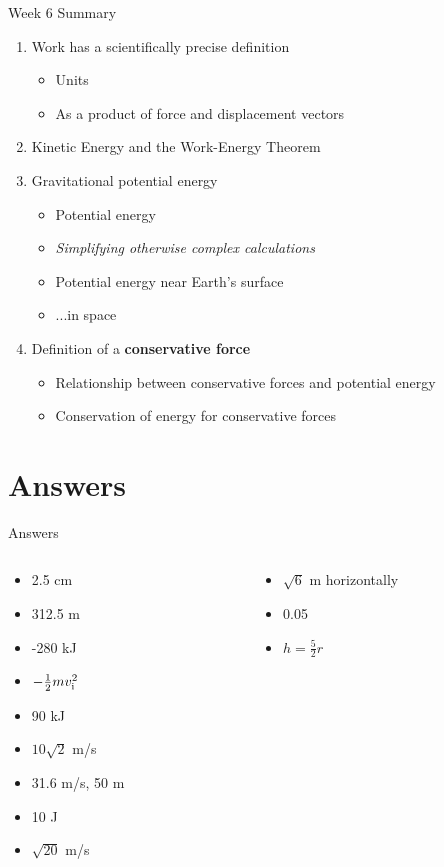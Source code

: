 \documentclass{beamer}
\begin{document}
\begin{frame}{Week 6 Summary}
\begin{enumerate}
\item \alert{Work} has a scientifically precise definition
\begin{itemize}
\item Units
\item As a product of force and displacement vectors
\end{itemize}
\item Kinetic Energy and the \alert{Work-Energy Theorem}
\item Gravitational potential energy
\begin{itemize}
\item Potential energy
\item \textit{Simplifying otherwise complex calculations}
\item Potential energy near Earth's surface
\item ...in space
\end{itemize}
\item Definition of a \textbf{conservative force}
\begin{itemize}
\item Relationship between conservative forces and potential energy
\item Conservation of energy for conservative forces
\end{itemize}
\end{enumerate}
\end{frame}

\section{Answers}

\begin{frame}{Answers}
\begin{columns}[T]
\begin{column}{0.5\textwidth}
\begin{itemize}
\item 2.5 cm
\item 312.5 m
\item -280 kJ
\item $-\frac{1}{2} m v_{\rm i}^2$
\item 90 kJ
\item $10\sqrt{2}$ m/s
\item 31.6 m/s, 50 m
\item 10 J
\item $\sqrt{20}$ m/s
\end{itemize}
\end{column}
\begin{column}{0.5\textwidth}
\begin{itemize}
\item $\sqrt{6}$ m horizontally
\item 0.05
\item $h = \frac{5}{2}r$
\end{itemize}
\end{column}
\end{columns}
\end{frame}
\end{document}
